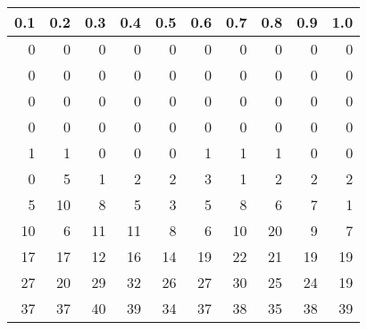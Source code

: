 \begin{tabular}{|rrrrrrrrrr}
  \hline
0.1 & 0.2 & 0.3 & 0.4 & 0.5 & 0.6 & 0.7 & 0.8 & 0.9 & 1.0 \\ 
  \hline
0 & 0 & 0 & 0 & 0 & 0 & 0 & 0 & 0 & 0 \\ 
  0 & 0 & 0 & 0 & 0 & 0 & 0 & 0 & 0 & 0 \\ 
  0 & 0 & 0 & 0 & 0 & 0 & 0 & 0 & 0 & 0 \\ 
  0 & 0 & 0 & 0 & 0 & 0 & 0 & 0 & 0 & 0 \\ 
  1 & 1 & 0 & 0 & 0 & 1 & 1 & 1 & 0 & 0 \\ 
  0 & 5 & 1 & 2 & 2 & 3 & 1 & 2 & 2 & 2 \\ 
  5 & 10 & 8 & 5 & 3 & 5 & 8 & 6 & 7 & 1 \\ 
  10 & 6 & 11 & 11 & 8 & 6 & 10 & 20 & 9 & 7 \\ 
  17 & 17 & 12 & 16 & 14 & 19 & 22 & 21 & 19 & 19 \\ 
  27 & 20 & 29 & 32 & 26 & 27 & 30 & 25 & 24 & 19 \\ 
  37 & 37 & 40 & 39 & 34 & 37 & 38 & 35 & 38 & 39 \\ 
   \hline
\end{tabular}

